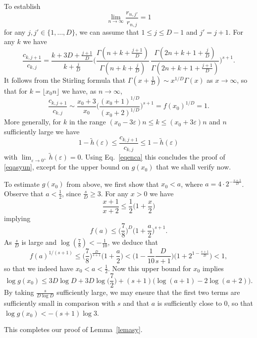 \documentclass{article}
\numberwithin{equation}{section}
\theoremstyle{remark}
\newenvironment{Proof}[1][Proof]{\proof[\rm\textbf{#1}]}{\endproof}
\newcommand{\eps}{\varepsilon}
\begin{document}
\begin{Proof}
\bigskip

To establish 
 $$\lim_{n\to\infty} \frac{r_{n,j'}}{r_{n,j}} = 1$$
for any $j,j'\in\{1,\ldots,D\}$, we can assume that $1\leq j \leq D-1$ and $j'=j+1$. For any $k $ we have
$$\frac{c_{k,j+1}}{c_{k,j}} = 
\frac{k+3D+\frac{j+1}{D}}{k+ \frac{j}{D}} \bigg( \frac{ \Gamma( n+k+\frac{j+1}{D})}{\Gamma( n+k +\frac{j }{D})}
\, \frac{ \Gamma( 2n+k+1+\frac{j }{D})}{\Gamma( 2n+k+1+\frac{j+1}{D})}\bigg)^{s+1}.$$
It follows from the Stirling formula that $\Gamma(x+\frac1{D}) \sim x^{1/D}\Gamma(x)$ as $x\to\infty$, so that for $k = \lfloor x_0 n\rfloor $ we have, as $n\to\infty$,
$$ \frac{c_{k,j+1}}{c_{k,j}} \sim
\frac{x_0+3}{x_0}\bigg( \frac{(x_0+1)^{1/D}}{(x_0+2)^{1/D}}\bigg)^{s+1} = f(x_0)^{1/D} = 1.$$
More generally, for $k$ in the range $ (x_0-3\eps)n \leq k \leq (x_0+3\eps)n $ and $n$ sufficiently large we have
$$1-\tilde h(\eps) \leq \frac{c_{k,j+1}}{c_{k,j}} \leq 1-\tilde h(\eps) $$
with $\lim_{\eps\to0^+} \tilde h(\eps) = 0$. Using Eq.~\eqref{eqenca} this concludes the proof of \eqref{eqasyun}, except for the upper bound on $g(x_0)$ that we shall verify now.

 \bigskip

To estimate $g(x_0)$ from above, we first show that $x_0<a$, where $a = 4\cdot 2^{-\frac{s+1}{D}}$.
Observe that $a < \frac12$, since $\frac{s}{D}\geq 3$. For any $x>0$ we have
$$ \frac{x+1}{x+2} \leq \frac{1}{2} \Big( 1 + \frac{x}{2}\Big)$$
implying
$$f(a) \leq \Big( \frac78\Big) ^D  \Big( 1 + \frac{a}{2}\Big)^{s+1}.$$
As $\frac sD$ is large and $\log(\frac78) < -\frac{1}{10}$, we deduce that
$$f(a)^{1/(s+1)} \leq \Big( \frac78\Big) ^{\frac{D}{s+1}} 
  \Big( 1 + \frac{a}{2}\Big) < \bigg( 1 -  \frac{1}{10} \frac{D}{s+1}\bigg)   \big( 1 +   2^{1-\frac{s+1}{D}}\big) < 1,$$
so that we indeed have $x_0<a<\frac12$.
Now this upper bound for $x_0$ implies
$$\log g(x_0) \leq 3D\log D + 3D  \log  \Big(\frac72\Big)  + (s+1) \big(  \log(a+1) - 2  \log (a+2)\big).$$
By taking $\frac{s}{D\log D}$ sufficiently large, we may ensure that the first two terms are sufficiently small in comparison with $s$ and that $a$ is sufficiently close to 0, so that $\log g(x_0) < - (s+1) \log 3$.

  This completes our proof of Lemma~\ref{lemasy}.
\end{Proof}

 \bigskip
\end{document}
